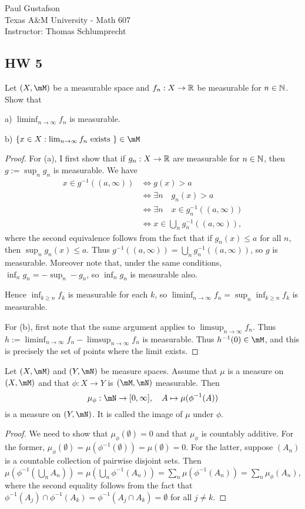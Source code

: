 \documentclass{article}
\begin{document}
\noindent Paul Gustafson\\
\noindent Texas A\&M University - Math 607\\ 
\noindent Instructor: Thomas Schlumprecht

\subsection*{HW 5}
 Let $(X, \mM)$ be a measurable space and $f_n : X \to \mathbb{R}$ be measurable for $n \in \mathbb{N}$. Show that 

a) $\liminf_{n \to \infty} f_n$ is measurable.

b) $\{x \in X : \lim_{n \to \infty} f_n \text{ exists } \} \in \mM$

\begin{proof}
For (a), I first show that if $g_n : X \to \mathbb{R}$ are measurable for $n \in \mathbb{N}$, then $g := \sup_n g_n$ is measurable.  
We have
\begin{align*}
x \in g^{-1}((a, \infty)) & \iff g(x) > a
\\ & \iff \exists n \quad g_n(x) > a
\\ & \iff \exists n \quad x \in g_n^{-1}((a,\infty))
\\ & \iff x \in \bigcup_n g_n^{-1}((a, \infty)),
\end{align*}
where the second equivalence follows from the fact that if $g_n(x) \le a$ for all $n$, then $\sup_n g_n(x) \le a$.
Thus $g^{-1}((a, \infty)) = \bigcup_n g_n^{-1}((a, \infty))$, so $g$ is measurable.  Moreover note that, under the same conditions, $\inf_n g_n = - \sup_n -g_n$, so $\inf_n g_n$ is measurable also.

Hence $\inf_{k \ge n} f_k$ is measurable for each $k$, so $\liminf_{n\to \infty} f_n = \sup_n \inf_{k \ge n} f_k$ is measurable.

For (b), first note that the same argument applies to $\limsup_{n \to \infty} f_n$.  Thus $h := \liminf_{n \to \infty} f_n - \limsup_{n \to \infty} f_n$ is measurable.  Thus $h^{-1}(0) \in \mM$, and this is precisely the set of points where the limit exists.
\end{proof}

 Let $(X, \mM)$ and $(Y, \mN)$ be measure spaces. Assume that $\mu$ is a measure on $(X, \mM)$ and that $\phi: X \to Y$ is $(\mM, \mN)$ measurable. Then 
$$ \mu_\phi : \mN \to [0, \infty], \quad A \mapsto \mu(\phi^{-1}(A))$$
is a measure on $(Y, \mN)$. It is called the image of $\mu$ under $\phi$.
\begin{proof}
We need to show that $\mu_\phi(\emptyset) = 0$ and that $\mu_\phi$ is countably additive. For the former, $\mu_\phi(\emptyset) = \mu(\phi^{-1}(\emptyset)) = \mu(\emptyset) = 0$.  For the latter, suppose $(A_n)$ is a countable collection of pairwise disjoint sets.  Then $\mu(\phi^{-1}(\bigcup_n A_n)) = \mu(\bigcup_n \phi^{-1} (A_n)) = \sum_n \mu(\phi^{-1}(A_n)) = \sum_n \mu_\phi(A_n)$, where the second equality follows from the fact that $\phi^{-1}(A_j) \cap \phi^{-1}(A_k) = \phi^{-1}(A_j \cap A_k) = \emptyset$ for all $j \neq k$.
\end{proof}
\end{document}
